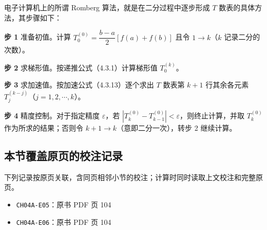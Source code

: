 \documentclass[
  10pt,
  fontset=fandol]{ctexart}
\providecommand{\tightlist}{%
  \setlength{\itemsep}{0pt}\setlength{\parskip}{0pt}}
\begin{document}
电子计算机上的所谓 Romberg 算法，就是在二分过程中逐步形成 \(T\) 数表的具体方法，其步骤如下：

\textbf{步 1} 准备初值。计算 \(T_0^{(0)}=\dfrac{b-a}{2}[f(a)+f(b)]\) 且令 \(1\to k\)（\(k\) 记录二分的次数）。

\textbf{步 2} 求梯形值。按递推公式（4.3.1）计算梯形值 \(T_0^{(k)}\)。

\textbf{步 3} 求加速值。按加速公式（4.3.13）逐个求出 \(T\) 数表第 \(k+1\) 行其余各元素 \(T_j^{(k-j)}\)（\(j=1,2,\cdots,k\)）。

\textbf{步 4} 精度控制。对于指定精度 \(\varepsilon\)，若 \(|T_k^{(0)}-T_{k-1}^{(0)}|<\varepsilon\)，则终止计算，并取 \(T_k^{(0)}\) 作为所求的结果；否则令 \(k+1\to k\)（意即二分一次），转步 2 继续计算。

\subsection{本节覆盖原页的校注记录}\label{ux672cux8282ux8986ux76d6ux539fux9875ux7684ux6821ux6ce8ux8bb0ux5f55}

下列记录按原页关联，含同页相邻小节的校注；计算时同时读取上文校注和完整原页。

\begin{itemize}
\tightlist
\item
  \texttt{CH04A-E05}：原书 PDF 页 104
\item
  \texttt{CH04A-E06}：原书 PDF 页 104
\end{itemize}
\end{document}
